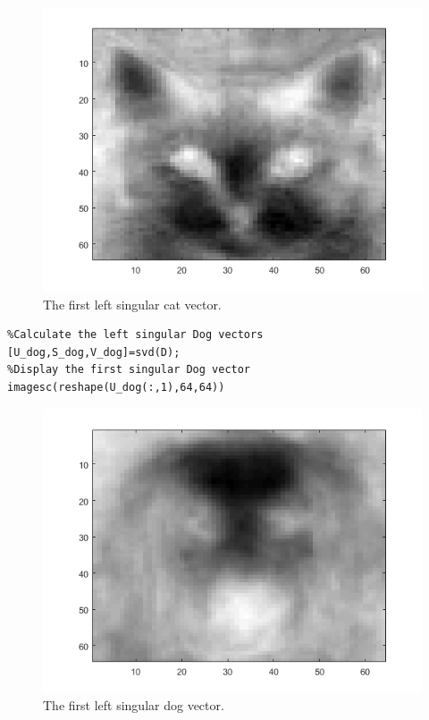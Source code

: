 \documentclass[leqno]{article}
\theoremstyle{nonumberplain}
\begin{document}
\begin{figure}[h]
\begin{center}
\includegraphics[scale=.4]{left_singular_cat.png}
\caption{The first left singular cat vector.}
\end{center}
\end{figure}


\begin{lstlisting}
%Calculate the left singular Dog vectors
[U_dog,S_dog,V_dog]=svd(D);
%Display the first singular Dog vector
imagesc(reshape(U_dog(:,1),64,64))
\end{lstlisting}

\begin{figure}[h]
\begin{center}
\includegraphics[scale=.4]{left_singular_dog.png}
\caption{The first left singular dog vector.}
\end{center}
\end{figure}
\end{document}
